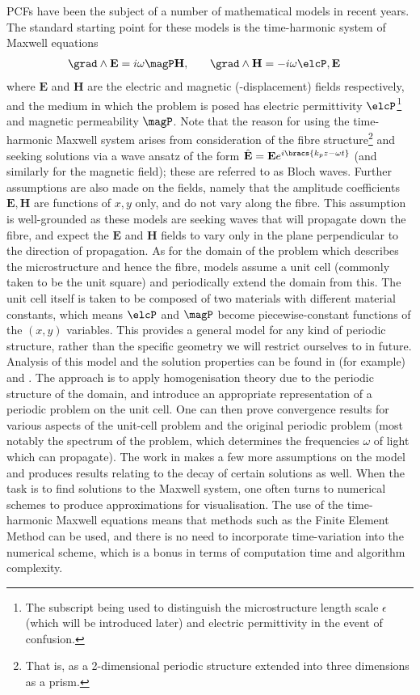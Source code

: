 PCFs have been the subject of a number of mathematical models in recent years.
The standard starting point for these models is the time-harmonic system of Maxwell equations
\begin{align*}
	\grad\wedge\mathbf{E} &= i\omega\magP\mathbf{H}, &\quad \grad\wedge\mathbf{H} &= -i\omega\elcP,\mathbf{E}
\end{align*} 
where $\mathbf{E}$ and $\mathbf{H}$ are the electric and magnetic (-displacement) fields respectively, and the medium in which the problem is posed has electric permittivity $\elcP$\footnote{The subscript being used to distinguish the microstructure length scale $\epsilon$ (which will be introduced later) and electric permittivity in the event of confusion.} and magnetic permeability $\magP$. 
Note that the reason for using the time-harmonic Maxwell system arises from consideration of the fibre structure\footnote{That is, as a 2-dimensional periodic structure extended into three dimensions as a prism.} and seeking solutions via a wave ansatz of the form $\hat{\mathbf{E}}=\mathbf{E}e^{i\bracs{k_{p}z-\omega t}}$ (and similarly for the magnetic field); these are referred to as Bloch waves.
Further assumptions are also made on the fields, namely that the amplitude coefficients $\mathbf{E},\mathbf{H}$ are functions of $x,y$ only, and do not vary along the fibre.
This assumption is well-grounded as these models are seeking waves that will propagate down the fibre, and expect the $\mathbf{E}$ and $\mathbf{H}$ fields to vary only in the plane perpendicular to the direction of propagation.
As for the domain of the problem which describes the microstructure and hence the fibre, models assume a unit cell (commonly taken to be the unit square) and periodically extend the domain from this.
The unit cell itself is taken to be composed of two materials with different material constants, which means $\elcP$ and $\magP$ become piecewise-constant functions of the $(x,y)$ variables.
This provides a general model for any kind of periodic structure, rather than the specific geometry we will restrict ourselves to in future.
Analysis of this model and the solution properties can be found in (for example) \cite{cooper2014bandgaps} and \cite{soussi2006modeling}.
The approach is to apply homogenisation theory due to the periodic structure of the domain, and introduce  an appropriate representation of a periodic problem on the unit cell.
One can then prove convergence results for various aspects of the unit-cell problem and the original periodic problem (most notably the spectrum of the problem, which determines the frequencies $\omega$ of light which can propagate).
The work in \cite{soussi2006modeling} makes a few more assumptions on the model and produces results relating to the decay of certain solutions as well.
When the task is to find solutions to the Maxwell system, one often turns to numerical schemes to produce approximations for visualisation.
The use of the time-harmonic Maxwell equations means that methods such as the Finite Element Method can be used, and there is no need to incorporate time-variation into the numerical scheme, which is a bonus in terms of computation time and algorithm complexity. \newline

